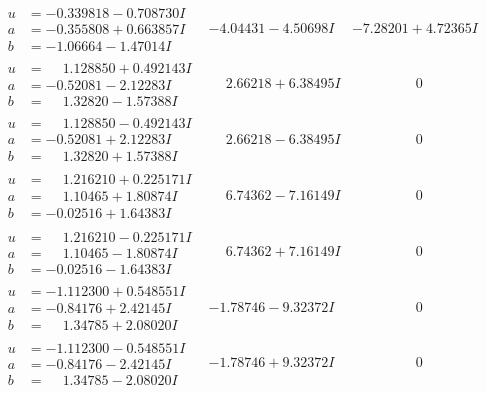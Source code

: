 \documentclass[1p]{elsarticle_modified}
\theoremstyle{definition}
\begin{document}
$$\begin{array}{c|c|c}
\begin{aligned}
u &= -0.339818 - 0.708730 I \\
a &= -0.355808 + 0.663857 I \\
b &= -1.06664 - 1.47014 I\end{aligned}
 & -4.04431 - 4.50698 I & -7.28201 + 4.72365 I \\ \hline\begin{aligned}
u &= \phantom{-}1.128850 + 0.492143 I \\
a &= -0.52081 - 2.12283 I \\
b &= \phantom{-}1.32820 - 1.57388 I\end{aligned}
 & \phantom{-}2.66218 + 6.38495 I & \phantom{-0.000000 } 0 \\ \hline\begin{aligned}
u &= \phantom{-}1.128850 - 0.492143 I \\
a &= -0.52081 + 2.12283 I \\
b &= \phantom{-}1.32820 + 1.57388 I\end{aligned}
 & \phantom{-}2.66218 - 6.38495 I & \phantom{-0.000000 } 0 \\ \hline\begin{aligned}
u &= \phantom{-}1.216210 + 0.225171 I \\
a &= \phantom{-}1.10465 + 1.80874 I \\
b &= -0.02516 + 1.64383 I\end{aligned}
 & \phantom{-}6.74362 - 7.16149 I & \phantom{-0.000000 } 0 \\ \hline\begin{aligned}
u &= \phantom{-}1.216210 - 0.225171 I \\
a &= \phantom{-}1.10465 - 1.80874 I \\
b &= -0.02516 - 1.64383 I\end{aligned}
 & \phantom{-}6.74362 + 7.16149 I & \phantom{-0.000000 } 0 \\ \hline\begin{aligned}
u &= -1.112300 + 0.548551 I \\
a &= -0.84176 + 2.42145 I \\
b &= \phantom{-}1.34785 + 2.08020 I\end{aligned}
 & -1.78746 - 9.32372 I & \phantom{-0.000000 } 0 \\ \hline\begin{aligned}
u &= -1.112300 - 0.548551 I \\
a &= -0.84176 - 2.42145 I \\
b &= \phantom{-}1.34785 - 2.08020 I\end{aligned}
 & -1.78746 + 9.32372 I & \phantom{-0.000000 } 0 \\ \hline\begin{aligned}

\end{aligned}
\end{array}$$
\end{document}
